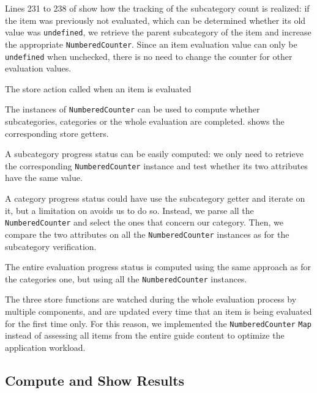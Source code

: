 Lines 231 to 238 of  show how the tracking of the subcategory count is realized: if the item was previously not evaluated, which can be determined whether its old value was \texttt{undefined}, we retrieve the parent subcategory of the item and increase the appropriate \texttt{NumberedCounter}. Since an item evaluation value can only be \texttt{undefined} when unchecked, there is no need to change the counter for other evaluation values.

\begin{listing}[!ht] 
	\caption{The store action called when an item is evaluated}
	\label{lst:app_implementation_progress_setcheckbox}
\end{listing}

The instances of \texttt{NumberedCounter} can be used to compute whether subcategories, categories or the whole evaluation are completed.  shows the corresponding store getters.

A subcategory progress status can be easily computed: we only need to retrieve the corresponding \texttt{NumberedCounter} instance and test whether its two attributes have the same value.

A category progress status could have use the subcategory getter and iterate on it, but a limitation on  avoids us to do so. Instead, we parse all the \texttt{NumberedCounter} and select the ones that concern our category. Then, we compare the two attributes on all the \texttt{NumberedCounter} instances as for the subcategory verification.

The entire evaluation progress status is computed using the same approach as for the categories one, but using all the \texttt{NumberedCounter} instances.

The three store functions are watched during the whole evaluation process by multiple components, and are updated every time that an item is being evaluated for the first time only. For this reason, we implemented the \texttt{NumberedCounter} \texttt{Map} instead of assessing all items from the entire guide content to optimize the application workload.

\subsection{Compute and Show Results}
\label{subsec:app_implementation_results}

